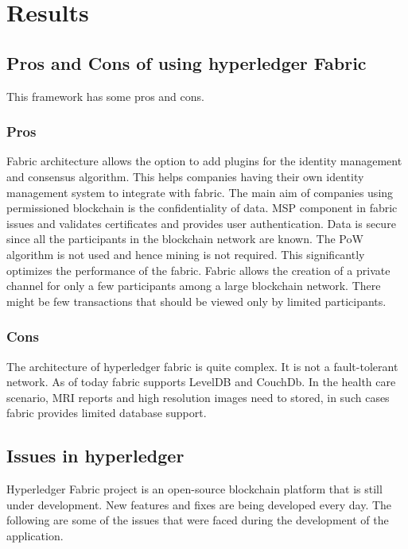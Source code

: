 \chapter{Results}
\label{ch:results}
%
%
\section{Pros and Cons of using hyperledger Fabric}
This framework has some pros and cons.
\label{sec:results:proscons}
\subsection{Pros}
Fabric architecture allows the option to add plugins for the identity management and consensus algorithm. This helps companies having their own identity management system to integrate with fabric.
The main aim of companies using permissioned blockchain is the confidentiality of data. MSP component in fabric issues and validates certificates and provides user authentication. Data is secure since all the participants in the blockchain network are known. 
The \ac{PoW} algorithm is not used and hence mining is not required. This significantly optimizes the performance of the fabric. Fabric allows the creation of a private channel for only a few participants among a large blockchain network. There might be few transactions that should be viewed only by limited participants.

\subsection{Cons}
The architecture of hyperledger fabric is quite complex. It is not a fault-tolerant network. As of today fabric supports LevelDB and CouchDb. In the health care scenario, MRI reports and high resolution images need to stored, in such cases fabric provides limited database support.

%
%
\section{Issues in hyperledger}


\label{sec:results:issues}
Hyperledger Fabric project is an open-source blockchain platform that is still under development. New features and fixes are being developed every day. The following are some of the issues that were faced during the development of the application.


